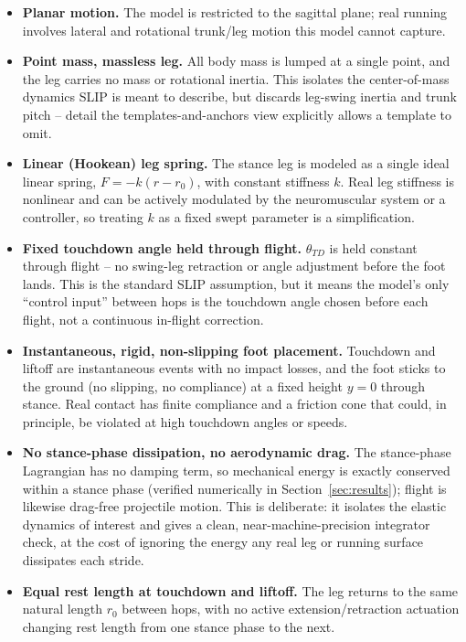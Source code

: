\documentclass[11pt]{article}
\begin{document}
\begin{itemize}[leftmargin=1.4em]
    \item \textbf{Planar motion.} The model is restricted to the
    sagittal plane; real running involves lateral and rotational
    trunk/leg motion this model cannot capture.
    \item \textbf{Point mass, massless leg.} All body mass is lumped
    at a single point, and the leg carries no mass or rotational
    inertia. This isolates the center-of-mass dynamics SLIP is meant
    to describe, but discards leg-swing inertia and trunk pitch --
    detail the templates-and-anchors view \cite{full1999} explicitly
    allows a template to omit.
    \item \textbf{Linear (Hookean) leg spring.} The stance leg is
    modeled as a single ideal linear spring, $F=-k(r-r_0)$, with
    constant stiffness $k$. Real leg stiffness is nonlinear and can be
    actively modulated by the neuromuscular system or a controller, so
    treating $k$ as a fixed swept parameter is a simplification.

    \item \textbf{Fixed touchdown angle held through flight.} $\theta_{TD}$
    is held constant through flight -- no swing-leg retraction or
    angle adjustment before the foot lands. This is the standard SLIP
    assumption, but it means the model's only ``control input'' between
    hops is the touchdown angle chosen before each flight, not a
    continuous in-flight correction.
    \item \textbf{Instantaneous, rigid, non-slipping foot placement.}
    Touchdown and liftoff are instantaneous events with no impact
    losses, and the foot sticks to the ground (no slipping, no
    compliance) at a fixed height $y=0$ through stance. Real contact
    has finite compliance and a friction cone that could, in
    principle, be violated at high touchdown angles or speeds.
    \item \textbf{No stance-phase dissipation, no aerodynamic drag.}
    The stance-phase Lagrangian has no damping term, so mechanical
    energy is exactly conserved within a stance phase (verified
    numerically in Section~\ref{sec:results}); flight is likewise
    drag-free projectile motion. This is deliberate: it isolates the
    elastic dynamics of interest and gives a clean,
    near-machine-precision integrator check, at the cost of ignoring
    the energy any real leg or running surface dissipates each
    stride.
    \item \textbf{Equal rest length at touchdown and liftoff.} The leg
    returns to the same natural length $r_0$ between hops, with no
    active extension/retraction actuation changing rest length from
    one stance phase to the next.
\end{itemize}
\end{document}

